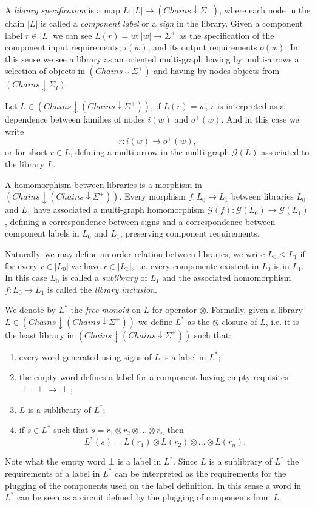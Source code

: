 \documentclass[oribibl]{llncs}
\newcommand{\G}{\mathcal{G}}
\begin{document}
A \emph{library specification} is a map $L:|L|\rightarrow
(Chains\downarrow \Sigma^+)$, where each node in the chain $|L|$ is
called a \emph{component label} or a \emph{sign} in the library. Given a component label
$r\in |L|$ we can see $L(r)=w:|w|\rightarrow \Sigma^+$ as the
specification of the component input requirements, $i(w)$, and its
output requirements $o(w)$. In this sense we see a library as an
oriented multi-graph having by multi-arrows a selection of
objects in $(Chains\downarrow \Sigma^+)$ and having by nodes objects
from $(Chains\downarrow \Sigma_I)$.

Let $L\in(Chains \downarrow(Chains \downarrow \Sigma^+))$, if
$L(r)=w$, $r$ is interpreted as a dependence between families of
nodes $i(w)$ and $o^+(w)$. And in this case we write
\[r:i(w)\rightarrow o^+(w),\] or for short $r\in L$, defining
a multi-arrow in the  multi-graph $\G(L)$ associated to the library
$L$.

A homomorphism between libraries is a morphism in $(Chains \downarrow(Chains
\downarrow \Sigma^+))$. Every morphism $f:L_0\rightarrow L_1$
between libraries $L_0$ and $L_1$ have associated a multi-graph
homomorphism $\G(f):\G(L_0)\rightarrow \G(L_1)$, defining a correspondence between signs and a correspondence between component labels in $L_0$ and $L_1$, preserving component requirements.

Naturally, we may define an order relation between libraries, we write $L_0\leq L_1$ if for every $r\in |L_0|$ we have $r\in |L_1|$, i.e. every componente existent in $L_0$ is in $L_1$. In this case $L_0$ is called a \emph{sublibrary} of $L_1$ and the associated homomorphism $f:L_0\rightarrow L_1$ is called the \emph{library inclusion}.

We denote by $L^\ast$ the \emph{free monoid} on $L$ for operator $\otimes$. Formally, given a library $L\in (Chains \downarrow(Chains
\downarrow \Sigma^+))$ we define $L^\ast$ as the $\otimes$-closure of $L$, i.e. it is the least library in $(Chains \downarrow (Chains\downarrow \Sigma^+))$ such that:
\begin{enumerate}
  \item every word generated using signs of $L$ is a label in $L^\ast$;
  \item the empty word defines a label for a component having empty requisites $\perp:\perp\rightarrow\perp$;
  \item $L$ is a sublibrary of $L^\ast$;
  \item if $s\in L^\ast$ such that $s=r_1\otimes r_2\otimes \ldots\otimes r_n$ then
  \[L^\ast(s)=L(r_1)\otimes L(r_2)\otimes\ldots\otimes L(r_n).\]
\end{enumerate}
Note what the empty word $\bot$ is a label in $L^\ast$. Since $L$ is a sublibrary of $L^\ast$ the requirements of a label in $L^\ast$ can be interpreted as the requirements for the plugging of the components used on the label definition. In this sense a word in $L^\ast$ can be seen as a circuit defined by the plugging of components from $L$.
\end{document}
